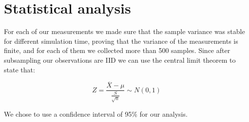 \section{Statistical analysis}

For each of our measurements we made sure that the sample variance was stable for different simulation time, proving that the variance of the measurements is finite, and for each of them we collected more than 500 samples. Since after subsampling our observations are IID we can use the central limit theorem to state that:


\begin{equation}
    Z = \frac{\overline{X} - \mu}{\frac{S}{\sqrt{n}}} \sim N(0,1)
\end{equation}

We chose to use a confidence interval of 95\% for our analysis.
